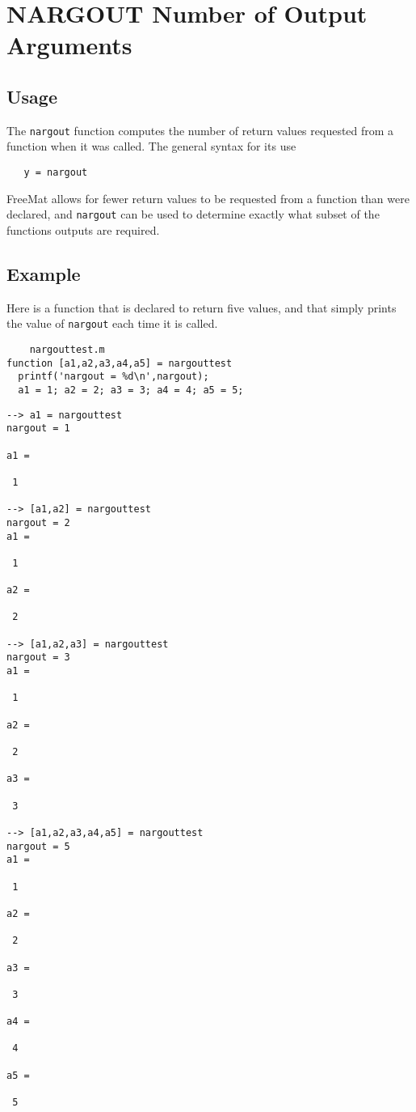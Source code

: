 \section{NARGOUT Number of Output Arguments}

\subsection{Usage}

The \verb|nargout| function computes the number of return values requested from
a function when it was called.  The general syntax for its use
\begin{verbatim}
   y = nargout
\end{verbatim}
FreeMat allows for
fewer return values to be requested from a function than were declared,
and \verb|nargout| can be used to determine exactly what subset of 
the functions outputs are required.  
\subsection{Example}

Here is a function that is declared to return five 
values, and that simply prints the value of \verb|nargout|
each time it is called.
\begin{verbatim}
    nargouttest.m
function [a1,a2,a3,a4,a5] = nargouttest
  printf('nargout = %d\n',nargout);
  a1 = 1; a2 = 2; a3 = 3; a4 = 4; a5 = 5;
\end{verbatim}
\begin{verbatim}
--> a1 = nargouttest
nargout = 1

a1 = 

 1 

--> [a1,a2] = nargouttest
nargout = 2
a1 = 

 1 

a2 = 

 2 

--> [a1,a2,a3] = nargouttest
nargout = 3
a1 = 

 1 

a2 = 

 2 

a3 = 

 3 

--> [a1,a2,a3,a4,a5] = nargouttest
nargout = 5
a1 = 

 1 

a2 = 

 2 

a3 = 

 3 

a4 = 

 4 

a5 = 

 5 
\end{verbatim}

